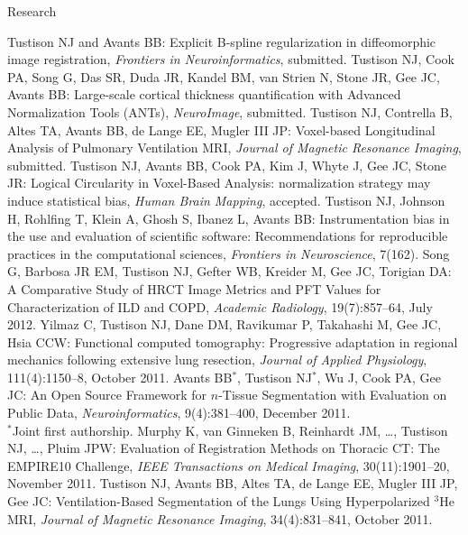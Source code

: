 \documentclass{resume}
\begin{document}
\begin{category}{Research}
   \begin{itemize}
    \citemnobullet Tustison NJ and Avants BB: Explicit B-spline regularization
    in diffeomorphic image registration, {\em Frontiers in Neuroinformatics}, submitted.
    \citemnobullet Tustison NJ, Cook PA, Song G, Das SR, Duda JR, Kandel BM,
    van Strien N, Stone JR, Gee JC, Avants BB: Large-scale cortical thickness
    quantification with Advanced Normalization Tools (ANTs), {\em NeuroImage}, submitted.
    \citemnobullet Tustison NJ, Contrella B, Altes TA, Avants BB, de Lange EE, Mugler III JP: Voxel-based Longitudinal Analysis of Pulmonary Ventilation MRI, {\em Journal of Magnetic Resonance Imaging}, submitted.
    \citemnobullet Tustison NJ, Avants BB, Cook PA, Kim J, Whyte J, Gee JC, Stone JR: Logical Circularity in Voxel-Based Analysis:  normalization strategy may induce statistical bias, {\em Human Brain Mapping}, accepted.
    \citemnobullet Tustison NJ, Johnson H, Rohlfing T, Klein A, Ghosh S, Ibanez L, Avants BB: Instrumentation bias in the use and evaluation of scientific software: Recommendations for reproducible practices in the computational sciences, {\em Frontiers in Neuroscience}, 7(162).
    \citemnobullet Song G, Barbosa JR EM, Tustison NJ, Gefter WB, Kreider M, Gee JC, Torigian DA: A Comparative Study of HRCT Image Metrics and PFT Values for Characterization of ILD and COPD, {\em Academic Radiology}, 19(7):857--64, July 2012.
    \citemnobullet Yilmaz C, Tustison NJ, Dane DM, Ravikumar P, Takahashi M, Gee JC, Hsia CCW:  Functional computed tomography:  Progressive adaptation in regional mechanics following extensive lung resection, {\em Journal of Applied Physiology}, 111(4):1150--8, October 2011.
    \citemnobullet Avants BB$^*$, Tustison NJ$^*$, Wu J, Cook PA, Gee JC:  An Open Source Framework for $n$-Tissue Segmentation with Evaluation on Public Data, {\em Neuroinformatics}, 9(4):381--400, December 2011.\\
    $^*$Joint first authorship.
    \citemnobullet Murphy K, van Ginneken B, Reinhardt JM, \ldots, Tustison NJ, \ldots, Pluim JPW:  Evaluation of Registration Methods on Thoracic CT:  The EMPIRE10 Challenge,  {\em IEEE Transactions on Medical Imaging}, 30(11):1901--20, November 2011.
    \citemnobullet Tustison NJ, Avants BB, Altes TA, de Lange EE, Mugler III JP, Gee JC:  Ventilation-Based Segmentation of the Lungs Using Hyperpolarized $^3$He MRI, {\em Journal of Magnetic Resonance Imaging}, 34(4):831--841, October 2011.

\end{itemize}
\end{category}
\end{document}
